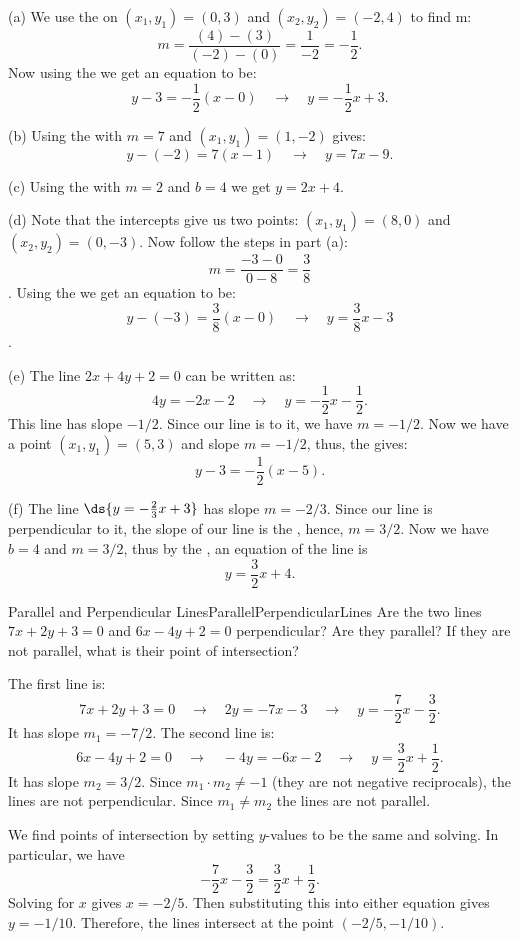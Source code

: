 \begin{solution} 
\noindent(a) We use the  on $(x_1,y_1)=(0,3)$ and $(x_2,y_2)=(-2,4)$ to find m:
$$m=\frac{(4)-(3)}{(-2)-(0)}=\frac{1}{-2}=-\frac{1}{2}.$$
Now using the  we get an equation to be:
$$y-3=-\frac{1}{2}\left(x-0\right)\quad\to\quad y=-\frac{1}{2}x+3.$$

\noindent(b) Using the  with $m=7$ and $(x_1,y_1)=(1,-2)$ gives:
$$y-(-2)=7(x-1)\quad\to\quad y = 7x-9.$$

\noindent(c) Using the  with $m=2$ and $b=4$ we get $y=2x+4$.

\noindent(d) Note that the intercepts give us two points: $(x_1,y_1)=(8,0)$ and $(x_2,y_2)=(0,-3)$.
Now follow the steps in part (a):
$$m=\frac{-3-0}{0-8}=\frac{3}{8}$$.
Using the  we get an equation to be:
$$y-(-3)=\frac{3}{8}\left(x-0\right)\quad\to\quad y=\frac{3}{8}x-3$$.

\noindent(e)  The line $2x+4y+2=0$ can be written as:
$$4y = -2x - 2 \quad\to\quad y=-\frac{1}{2}x-\frac{1}{2}.$$
This line has slope $-1/2$.
Since our line is  to it, we have $m=-1/2$.
Now we have a point $(x_1,y_1)=(5,3)$ and slope $m=-1/2$, thus, the  gives:
$$y-3=-\frac{1}{2}\left(x-5\right).$$

\noindent(f) The line $\ds{y=-\frac{2}{3}x+3}$ has slope $m=-2/3$.
Since our line is perpendicular to it, the slope of our line is the , hence, $m=3/2$.
Now we have $b=4$ and $m=3/2$, thus by the , an equation of the line is
$$y=\frac{3}{2}x+4.$$
\vspace{-0.5cm}
\end{solution}

\bigskip
\begin{example}{Parallel and Perpendicular Lines}{ParallelPerpendicularLines}
Are the two lines $7x+2y+3=0$ and $6x-4y+2=0$ perpendicular? Are they parallel? If they are not parallel, what is their point of intersection?
\end{example}

\begin{solution} 
The first line is:
$$7x+2y+3=0\quad\to\quad 2y=-7x-3\quad\to\quad y=-\frac{7}{2}x-\frac{3}{2}.$$
It has slope $m_1=-7/2$.
The second line is:
$$6x-4y+2=0\quad\to\quad -4y=-6x-2\quad\to\quad y=\frac{3}{2}x+\frac{1}{2}.$$
It has slope $m_2=3/2$.
Since $m_1\cdot m_2\neq -1$ (they are not negative reciprocals), the lines are not perpendicular.
Since $m_1\neq m_2$ the lines are not parallel.

We find points of intersection by setting $y$-values to be the same and solving.
In particular, we have
$$-\frac{7}{2}x-\frac{3}{2}=\frac{3}{2}x+\frac{1}{2}.$$
Solving for $x$ gives $x=-2/5$. Then substituting this into either equation gives $y=-1/10$.
Therefore, the lines intersect at the point $(-2/5,-1/10)$.
\end{solution}


